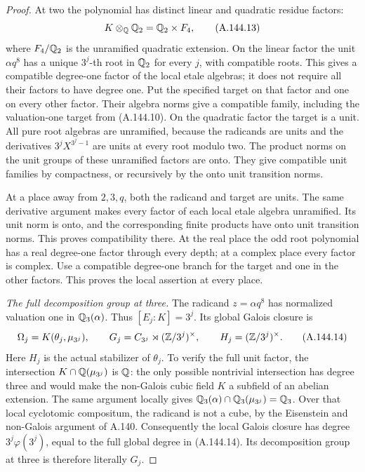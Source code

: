 \begin{proof}
At two the polynomial has distinct
linear and quadratic residue factors:
\[
                 K\otimes_\mathbb Q\mathbb Q_2=\mathbb Q_2\times F_4,
\tag{A.144.13}
\]
where \(F_4/\mathbb Q_2\) is the unramified
quadratic extension.
On the linear factor the unit
\(\alpha q^8\) has a unique
\(3^j\)-th root in \(\mathbb Q_2\) for every
\(j\), with compatible roots.
This gives a compatible degree-one
factor of the local etale algebras;
it does not require all their factors
to have degree one.
Put the specified target on that
factor and one on every other factor.
Their algebra norms give a compatible
family, including the valuation-one
target from (A.144.10).
On the quadratic factor the target is
a unit.
All pure root algebras are unramified,
because the radicands are units and
the derivatives \(3^jX^{3^j-1}\) are
units at every root modulo two.
The product norms on the unit groups
of these unramified factors are onto.
They give compatible unit families
by compactness, or recursively by
the onto unit transition norms.

At a place away from \(2,3,q\), both
the radicand and target are units.
The same derivative argument makes
every factor of each local etale
algebra unramified.
Its unit norm is onto, and the
corresponding finite products have
onto unit transition norms.
This proves compatibility there.
At the real place the odd root
polynomial has a real degree-one
factor through every depth; at a
complex place every factor is
complex.
Use a compatible degree-one branch
for the target and one in the
other factors.
This proves the local assertion
at every place.

\emph{The full decomposition group at three.}
The radicand \(z=\alpha q^8\) has
normalized valuation one in
\(\mathbb Q_3(\alpha)\).
Thus \([E_j:K]=3^j\).
Its global Galois closure is
\[
 \Omega_j=K(\theta_j,\mu_{3^j}),\qquad
 G_j=C_{3^j}\rtimes(\mathbb Z/3^j)^\times,\qquad
 H_j=(\mathbb Z/3^j)^\times .
\tag{A.144.14}
\]
Here \(H_j\) is the actual stabilizer
of \(\theta_j\).
To verify the full unit factor,
the intersection
\(K\cap\mathbb Q(\mu_{3^j})\) is \(\mathbb Q\):
the only possible nontrivial
intersection has degree three and
would make the non-Galois cubic
field \(K\) a subfield of an
abelian extension.
The same argument locally gives
\(\mathbb Q_3(\alpha)\cap\mathbb Q_3(\mu_{3^j})=\mathbb Q_3\).
Over that local cyclotomic compositum,
the radicand is not a cube, by the
Eisenstein and non-Galois argument
of A.140.
Consequently the local Galois closure
has degree \(3^j\varphi(3^j)\), equal
to the full global degree in
(A.144.14).
Its decomposition group at three
is therefore literally \(G_j\).


\end{proof}
